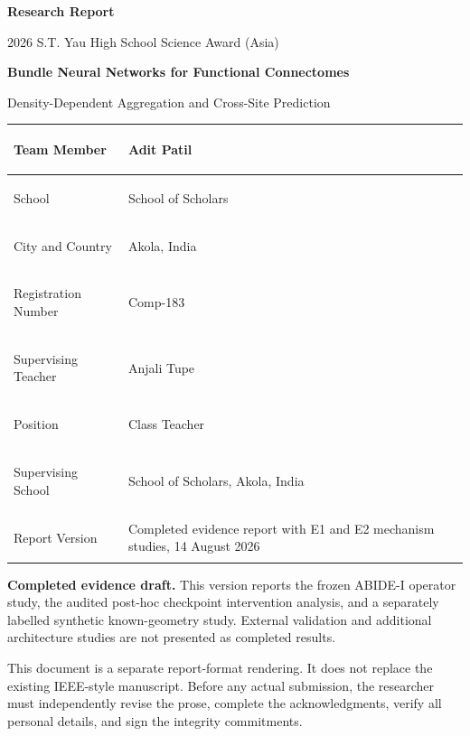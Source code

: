 \documentclass[11pt,a4paper]{article}
\newcommand{\draftnote}{\textbf{Completed evidence draft.} This version reports the frozen ABIDE-I operator study, the audited post-hoc checkpoint intervention analysis, and a separately labelled synthetic known-geometry study. External validation and additional architecture studies are not presented as completed results.}
\begin{document}
\hypersetup{pageanchor=false}

\thispagestyle{empty}
\begin{center}
  {\Large\bfseries Research Report}\par
  \vspace{0.35em}
  {\large 2026 S.T. Yau High School Science Award (Asia)}\par
  \vspace{2.0cm}
  {\LARGE\bfseries Bundle Neural Networks for Functional Connectomes}\par
  \vspace{0.35em}
  {\Large Density-Dependent Aggregation and Cross-Site Prediction}\par
  \vspace{1.2cm}
\end{center}

\renewcommand{\arraystretch}{1.35}
\noindent\begin{tabularx}{\textwidth}{|>{\bfseries\raggedright\arraybackslash}p{3.6cm}|Y|}
\hline
Team Member & Adit Patil \\
\hline
School & School of Scholars \\
\hline
City and Country & Akola, India \\
\hline
Registration Number & Comp-183 \\
\hline
Supervising Teacher & Anjali Tupe \\
\hline
Position & Class Teacher \\
\hline
Supervising School & School of Scholars, Akola, India \\
\hline
Report Version & Completed evidence report with E1 and E2 mechanism studies, 14 August 2026 \\
\hline
\end{tabularx}

\vfill
\noindent\begin{minipage}{\textwidth}
\small\color{muted}
\draftnote

This document is a separate report-format rendering. It does not replace the
existing IEEE-style manuscript. Before any actual submission, the researcher
must independently revise the prose, complete the acknowledgments,
verify all personal details, and sign the integrity commitments.
\end{minipage}
\clearpage

\hypersetup{pageanchor=true}
\setcounter{page}{1}
\end{document}
